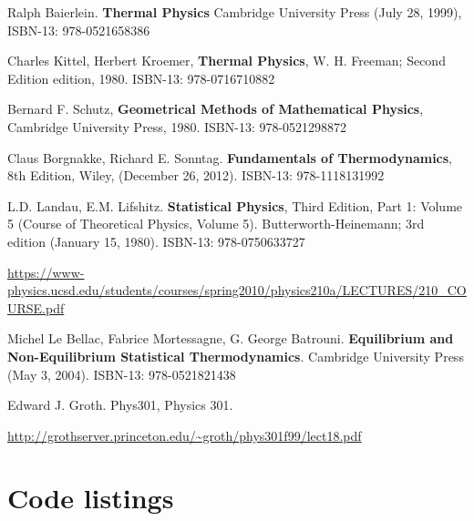 \documentclass[10pt]{amsart}
\begin{document}
\begin{thebibliography}{9}

Ralph Baierlein. \textbf{Thermal Physics} Cambridge University Press (July 28, 1999), ISBN-13: 978-0521658386

Charles Kittel, Herbert Kroemer, \textbf{Thermal Physics}, W. H. Freeman; Second Edition edition, 1980. 
ISBN-13: 978-0716710882

Bernard F. Schutz, \textbf{Geometrical Methods of Mathematical Physics}, Cambridge University Press, 1980.
ISBN-13: 978-0521298872

Claus Borgnakke, Richard E. Sonntag.  \textbf{Fundamentals of Thermodynamics}, 8th Edition, Wiley, (December 26, 2012). 
ISBN-13: 978-1118131992  

L.D. Landau, E.M. Lifshitz.  \textbf{Statistical Physics}, Third Edition, Part 1: Volume 5 (Course of Theoretical Physics, Volume 5). Butterworth-Heinemann; 3rd edition (January 15, 1980).  ISBN-13: 978-0750633727


\url{https://www-physics.ucsd.edu/students/courses/spring2010/physics210a/LECTURES/210_COURSE.pdf}


Michel Le Bellac, Fabrice Mortessagne, G. George Batrouni.  \textbf{Equilibrium and Non-Equilibrium Statistical Thermodynamics}.  Cambridge University Press (May 3, 2004).  ISBN-13: 978-0521821438

Edward J. Groth. Phys301, Physics 301.  

\url{http://grothserver.princeton.edu/~groth/phys301f99/lect18.pdf}

\end{thebibliography}







\clearpage
\onecolumn

\section{Code listings}
\end{document}
